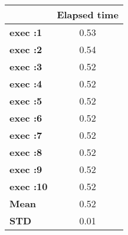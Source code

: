 \begin{tiny}\begin{tabular}{|l|c|}
\hline
&\textbf{Elapsed time}\\\hline
\textbf{exec :1}&0.53\\\hline
\textbf{exec :2}&0.54\\\hline
\textbf{exec :3}&0.52\\\hline
\textbf{exec :4}&0.52\\\hline
\textbf{exec :5}&0.52\\\hline
\textbf{exec :6}&0.52\\\hline
\textbf{exec :7}&0.52\\\hline
\textbf{exec :8}&0.52\\\hline
\textbf{exec :9}&0.52\\\hline
\textbf{exec :10}&0.52\\\hline
\textbf{ Mean}&0.52\\\hline
\textbf{ STD}&0.01\\\hline
\end{tabular}
\end{tiny}